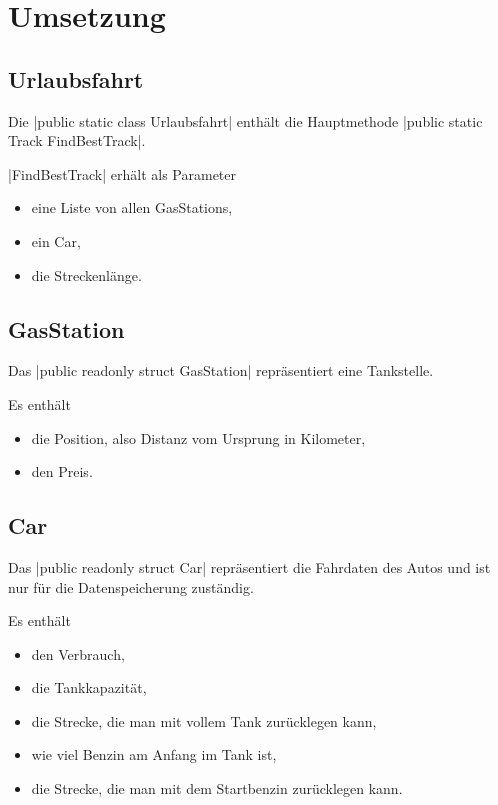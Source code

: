 \documentclass[a4paper,10pt,ngerman]{scrartcl}
\begin{document}
\section{Umsetzung}

\subsection{Urlaubsfahrt}
    Die |public static class Urlaubsfahrt| enthält die Hauptmethode |public static Track FindBestTrack|.
    
    |FindBestTrack| erhält als Parameter
        \begin{itemize}
        \item eine Liste von allen GasStations,
        \item ein Car,
        \item die Streckenlänge.
    \end{itemize}
   
\subsection{GasStation}
    Das |public readonly struct GasStation| repräsentiert eine Tankstelle.

    Es enthält
    \begin{itemize}
        \item die Position, also Distanz vom Ursprung in Kilometer,
        \item den Preis.
    \end{itemize}
    
\subsection{Car}
    Das |public readonly struct Car| repräsentiert die Fahrdaten des Autos und ist nur für die Datenspeicherung zuständig.

    Es enthält
    \begin{itemize}
        \item den Verbrauch,
        \item die Tankkapazität,
        \item die Strecke, die man mit vollem Tank zurücklegen kann,
        \item wie viel Benzin am Anfang im Tank ist,
        \item die Strecke, die man mit dem Startbenzin zurücklegen kann.
    \end{itemize}
    
\end{document}
